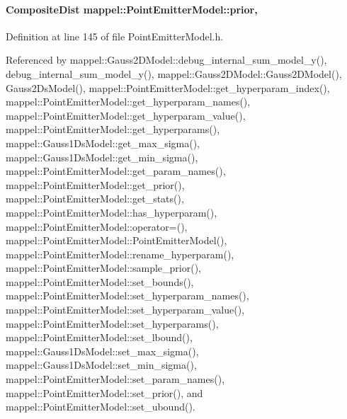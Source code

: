 \paragraph[{\texorpdfstring{prior}{prior}}]{\setlength{\rightskip}{0pt plus 5cm}Composite\+Dist mappel\+::\+Point\+Emitter\+Model\+::prior\hspace{0.3cm}{\ttfamily [protected]}, {\ttfamily [inherited]}}\hypertarget{classmappel_1_1PointEmitterModel_a393839f8eb1dd3d61c9369377742ba0e}{}\label{classmappel_1_1PointEmitterModel_a393839f8eb1dd3d61c9369377742ba0e}


Definition at line 145 of file Point\+Emitter\+Model.\+h.



Referenced by mappel\+::\+Gauss2\+D\+Model\+::debug\+\_\+internal\+\_\+sum\+\_\+model\+\_\+y(), debug\+\_\+internal\+\_\+sum\+\_\+model\+\_\+y(), mappel\+::\+Gauss2\+D\+Model\+::\+Gauss2\+D\+Model(), Gauss2\+Ds\+Model(), mappel\+::\+Point\+Emitter\+Model\+::get\+\_\+hyperparam\+\_\+index(), mappel\+::\+Point\+Emitter\+Model\+::get\+\_\+hyperparam\+\_\+names(), mappel\+::\+Point\+Emitter\+Model\+::get\+\_\+hyperparam\+\_\+value(), mappel\+::\+Point\+Emitter\+Model\+::get\+\_\+hyperparams(), mappel\+::\+Gauss1\+Ds\+Model\+::get\+\_\+max\+\_\+sigma(), mappel\+::\+Gauss1\+Ds\+Model\+::get\+\_\+min\+\_\+sigma(), mappel\+::\+Point\+Emitter\+Model\+::get\+\_\+param\+\_\+names(), mappel\+::\+Point\+Emitter\+Model\+::get\+\_\+prior(), mappel\+::\+Point\+Emitter\+Model\+::get\+\_\+stats(), mappel\+::\+Point\+Emitter\+Model\+::has\+\_\+hyperparam(), mappel\+::\+Point\+Emitter\+Model\+::operator=(), mappel\+::\+Point\+Emitter\+Model\+::\+Point\+Emitter\+Model(), mappel\+::\+Point\+Emitter\+Model\+::rename\+\_\+hyperparam(), mappel\+::\+Point\+Emitter\+Model\+::sample\+\_\+prior(), mappel\+::\+Point\+Emitter\+Model\+::set\+\_\+bounds(), mappel\+::\+Point\+Emitter\+Model\+::set\+\_\+hyperparam\+\_\+names(), mappel\+::\+Point\+Emitter\+Model\+::set\+\_\+hyperparam\+\_\+value(), mappel\+::\+Point\+Emitter\+Model\+::set\+\_\+hyperparams(), mappel\+::\+Point\+Emitter\+Model\+::set\+\_\+lbound(), mappel\+::\+Gauss1\+Ds\+Model\+::set\+\_\+max\+\_\+sigma(), mappel\+::\+Gauss1\+Ds\+Model\+::set\+\_\+min\+\_\+sigma(), mappel\+::\+Point\+Emitter\+Model\+::set\+\_\+param\+\_\+names(), mappel\+::\+Point\+Emitter\+Model\+::set\+\_\+prior(), and mappel\+::\+Point\+Emitter\+Model\+::set\+\_\+ubound().

